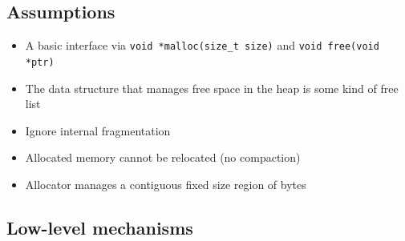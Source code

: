 \documentclass[11pt, a4paper]{article}
\theoremstyle{definition}
\theoremstyle{remark}
\begin{document}
\subsection{Assumptions}
\begin{itemize}
  \item A basic interface via \texttt{void *malloc(size\_t size)} and \texttt{void free(void *ptr)}
  \item The data structure that manages free space in the heap is some kind of free list
  \item Ignore internal fragmentation 
  \item Allocated memory cannot be relocated (no compaction) 
  \item Allocator manages a contiguous fixed size region of bytes
\end{itemize}
\subsection{Low-level mechanisms}
\end{document}
